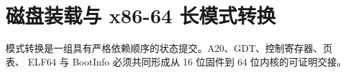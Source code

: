 \chapter{磁盘装载与 x86-64 长模式转换}

\begin{keyidea}
模式转换是一组具有严格依赖顺序的状态提交。A20、GDT、控制寄存器、页表、
ELF64 与 BootInfo 必须共同形成从 16 位固件到 64 位内核的可证明交接。
\end{keyidea}





